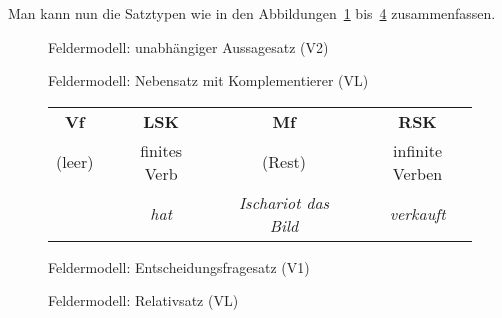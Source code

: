 Man kann nun die Satztypen wie in den Abbildungen~\ref{fig:feldertypen1} bis~\ref{fig:feldertypen4} zusammenfassen.

\begin{figure}
  \caption{Feldermodell: unabhängiger Aussagesatz (V2)}
  \label{fig:feldertypen1}
\end{figure}

\begin{figure}
  \caption{Feldermodell: Nebensatz mit Komplementierer (VL)}
  \label{fig:feldertypen2}
\end{figure}

\begin{figure}
    \begin{tabular}{cp{0.1em}cp{0.1em}cp{0.1em}c}
      \textbf{Vf} && \textbf{LSK} && \textbf{Mf} && \textbf{RSK} \\
      \cmidrule{1-1}\cmidrule{3-3}\cmidrule{5-5}\cmidrule{7-7}
	(leer) && finites Verb && (Rest) && infinite Verben \\
	&& \textit{hat} && \textit{Ischariot das Bild} && \textit{verkauft} \\
    \end{tabular}
  \caption{Feldermodell: Entscheidungsfragesatz (V1)}
  \label{fig:feldertypen3}
\end{figure}

\begin{figure}
  \caption{Feldermodell: Relativsatz (VL)}
  \label{fig:feldertypen4}
\end{figure}

